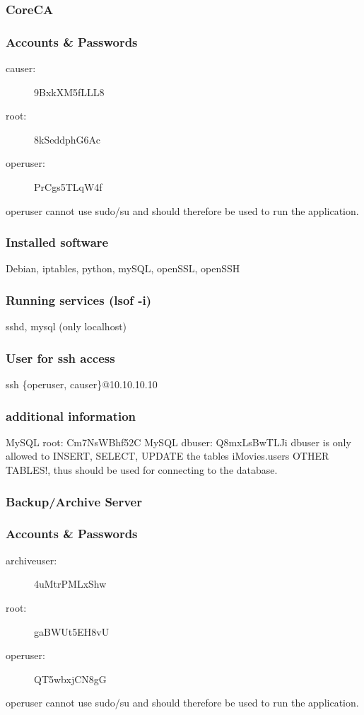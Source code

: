 \documentclass[a4paper, toc=index, 12pt, DIV14, twoside, BCOR2cm, headsepline, numbers=noenddot, bibliography=totoc]{report}
\begin{document}
\subsubsection{CoreCA}
\subsubsection*{Accounts \& Passwords}
\begin{multicols}{2}
\begin{description}
\item[causer:] 9BxkXM5fLLL8
\item[root:] 8kSeddphG6Ac
\item[operuser:] PrCgs5TLqW4f
\end{description}
\end{multicols}
operuser cannot use sudo/su and should therefore be used to run the application.
\subsubsection*{Installed software}
Debian, iptables, python, mySQL, openSSL, openSSH
\subsubsection*{Running services (lsof -i)}
sshd, mysql (only localhost)
\subsubsection*{User for ssh access}
ssh \{operuser, causer\}@10.10.10.10
\subsubsection*{additional information}
MySQL root: Cm7NsWBhf52C\newline
MySQL dbuser: Q8mxLsBwTLJi\newline
dbuser is only allowed to INSERT, SELECT, UPDATE the tables iMovies.users OTHER TABLES!, thus should be used for connecting to the database.

\subsubsection{Backup/Archive Server}
\subsubsection*{Accounts \& Passwords}
\begin{multicols}{2}
\begin{description}
\item[archiveuser:] 4uMtrPMLxShw
\item[root:] gaBWUt5EH8vU
\item[operuser:] QT5wbxjCN8gG
\end{description}
\end{multicols}
operuser cannot use sudo/su and should therefore be used to run the application.
\end{document}
